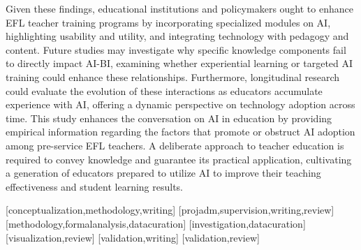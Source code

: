 \documentclass[english]{textolivre}
\begin{document}
Given these findings, educational institutions and policymakers ought to enhance EFL teacher training programs by incorporating specialized modules on AI, highlighting usability and utility, and integrating technology with pedagogy and content. Future studies may investigate why specific knowledge components fail to directly impact AI-BI, examining whether experiential learning or targeted AI training could enhance these relationships. Furthermore, longitudinal research could evaluate the evolution of these interactions as educators accumulate experience with AI, offering a dynamic perspective on technology adoption across time. This study enhances the conversation on AI in education by providing empirical information regarding the factors that promote or obstruct AI adoption among pre-service EFL teachers. A deliberate approach to teacher education is required to convey knowledge and guarantee its practical application, cultivating a generation of educators prepared to utilize AI to improve their teaching effectiveness and student learning results.

\printbibliography\label{sec-bib}


\begin{contributors}
[conceptualization,methodology,writing]
[projadm,supervision,writing,review]
[methodology,formalanalysis,datacuration]
[investigation,datacuration]
[visualization,review]
[validation,writing]
[validation,review]
\end{contributors}
\end{document}
